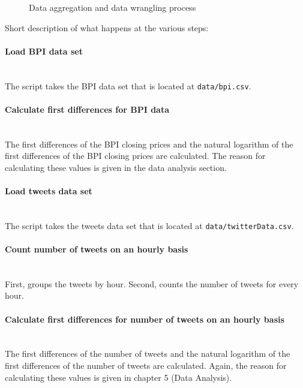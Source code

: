\documentclass[a4paper,12pt]{article}
\begin{document}
\begin{spacing}{1.2}
\begin{figure}[H]
\caption{Data aggregation and data wrangling process} \label{fig:dataaggregation}
\end{figure}

Short description of what happens at the various steps: 
\paragraph{Load BPI data set}\mbox{}\\
The script takes the BPI data set that is located at \verb|data/bpi.csv|.

\paragraph{Calculate first differences for BPI data}\mbox{}\\
The first differences of the BPI closing prices and the natural logarithm of the first differences of the BPI closing prices are calculated. The reason for calculating these values is given in the data analysis section.

\paragraph{Load tweets data set}\mbox{}\\ 
The script takes the tweets data set that is located at \verb|data/twitterData.csv|.

\paragraph{Count number of tweets on an hourly basis}\mbox{}\\ First, groups the tweets by hour. Second, counts the number of tweets for every hour.

\paragraph{Calculate first differences for number of tweets on an hourly basis}\mbox{}\\ 
The first differences of the number of tweets and the natural logarithm of the first differences of the number of tweets are calculated. Again, the reason for calculating these values is given in chapter 5 (Data Analysis).


\end{spacing}
\end{document}
